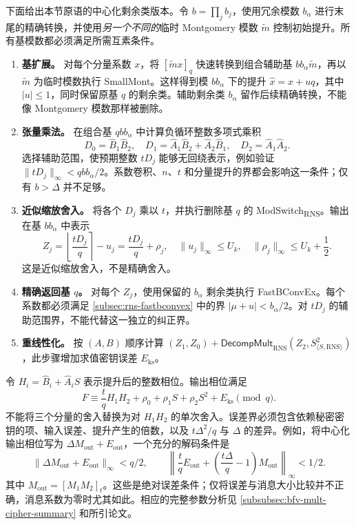 下面给出本节原语的中心化剩余类版本。令 $b=\prod_jb_j$，使用冗余模数 $b_\alpha$ 进行末尾的精确转换，并使用\emph{另一个不同的}临时 Montgomery 模数 $\widetilde m$ 控制初始提升。所有基模数都必须满足所需互素条件。
\begin{enumerate}
\item \textbf{基扩展。} 对每个分量系数 $x$，将 $[\widetilde m x]_q$ 快速转换到组合辅助基 $bb_\alpha\widetilde m$，再以 $\widetilde m$ 为临时模数执行 \textsf{SmallMont}。这样得到模 $bb_\alpha$ 下的提升 $\widehat x=x+uq$，其中 $|u|\leq1$，同时保留原基 $q$ 的剩余类。辅助剩余类 $b_\alpha$ 留作后续精确转换，不能像 Montgomery 模数那样被删除。
\item \textbf{张量乘法。} 在组合基 $qbb_\alpha$ 中计算负循环整数多项式乘积
\[
D_0=\widehat B_1\widehat B_2,\quad
D_1=\widehat A_1\widehat B_2+\widehat A_2\widehat B_1,\quad
D_2=\widehat A_1\widehat A_2.
\]
选择辅助范围，使预期整数 $tD_j$ 能够无回绕表示，例如验证 $\|tD_j\|_\infty<qbb_\alpha/2$。系数卷积、$n$、$t$ 和分量提升的界都会影响这一条件；仅有 $b>\Delta$ 并不足够。
\item \textbf{近似缩放舍入。} 将各个 $D_j$ 乘以 $t$，并执行删除基 $q$ 的 \textsf{ModSwitch\textsubscript{RNS}}。输出在基 $bb_\alpha$ 中表示
\[
Z_j=\left\lfloor\frac{tD_j}{q}\right\rceil-u_j
=\frac{tD_j}{q}+\rho_j,\quad
\|u_j\|_\infty\leq U_k,\quad
\|\rho_j\|_\infty\leq U_k+\frac12.
\]
这是近似缩放舍入，不是精确舍入。
\item \textbf{精确返回基 $q$。} 对每个 $Z_j$，使用保留的 $b_\alpha$ 剩余类执行 \textsf{FastBConvEx}。每个系数都必须满足 \autoref{subsec:rns-fastbconvex} 中的界 $|\mu+u|<b_\alpha/2$。对 $tD_j$ 的辅助范围界，不能代替这一独立的纠正界。
\item \textbf{重线性化。} 按 $(A,B)$ 顺序计算 $(Z_1,Z_0)+\textsf{DecompMult}_{\mathrm{RNS}}(Z_2,S^2_{\langle S,\mathrm{RNS}\rangle})$，此步骤增加求值密钥误差 $E_{\mathrm{ks}}$。
\end{enumerate}

令 $H_i=\widehat B_i+\widehat A_iS$ 表示提升后的整数相位。输出相位满足
\[
F\equiv\frac tqH_1H_2+\rho_0+\rho_1S+\rho_2S^2+E_{\mathrm{ks}}\pmod q.
\]
不能将三个分量的舍入替换为对 $H_1H_2$ 的单次舍入。误差界必须包含依赖秘密密钥的项、输入误差、提升产生的倍数，以及 $t\Delta^2/q$ 与 $\Delta$ 的差异。例如，将中心化输出相位写为 $\Delta M_{\mathrm{out}}+E_{\mathrm{out}}$，一个充分的解码条件是
\[
\|\Delta M_{\mathrm{out}}+E_{\mathrm{out}}\|_\infty<q/2,\qquad
\left\|\frac tqE_{\mathrm{out}}+\left(\frac{t\Delta}{q}-1\right)M_{\mathrm{out}}\right\|_\infty<1/2.
\]
其中 $M_{\mathrm{out}}=[M_1M_2]_t$。这些是绝对误差条件；仅将误差与消息大小比较并不正确，消息系数为零时尤其如此。相应的完整参数分析见 \autoref{subsubsec:bfv-mult-cipher-summary} 和所引论文。


